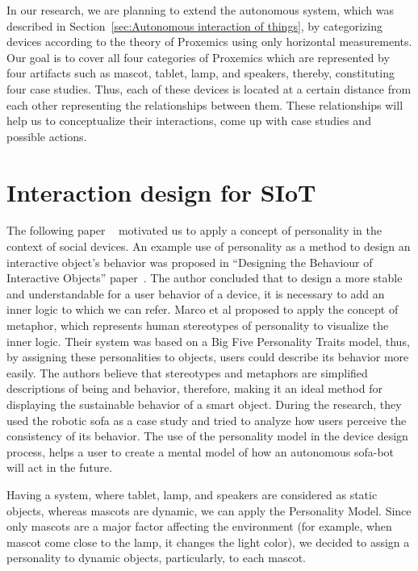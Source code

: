 In our research, we are planning to extend the autonomous system, which was
described in Section~\ref{sec:Autonomous interaction of things}, by categorizing devices
according to the theory of Proxemics using only horizontal measurements.
Our goal is to cover all four categories of Proxemics which are represented by four
artifacts such as mascot, tablet, lamp, and speakers, thereby, constituting four case studies.
Thus, each of these devices is located at a certain distance from each other representing
the relationships between them.
These relationships will help us to conceptualize their interactions, come up with case studies and possible actions.

\section{Interaction design for SIoT}
\label{sec:Interaction design for SIoT}

The following paper ~\cite{soro2018social} motivated us to apply a concept of
personality in the context of social devices.
An example use of personality as a method to design an interactive object’s behavior
was proposed in “Designing the Behaviour of Interactive Objects” paper~\cite{spadafora2016designing}.
The author concluded that to design a more stable and understandable
for a user behavior of a device, it is necessary to add an inner logic to which we can refer.
Marco et al proposed to apply the concept of metaphor, which represents human stereotypes
of personality to visualize the inner logic.
Their system was based on a Big Five Personality Traits model, thus,
by assigning these personalities to objects, users could describe its behavior more easily.
The authors believe that stereotypes and metaphors are simplified descriptions of being and behavior,
therefore, making it an ideal method for displaying the sustainable behavior of a smart object.
During the research, they used the robotic sofa as a case study and tried to analyze how
users perceive the consistency of its behavior.
The use of the personality model in the device design process, helps a user to create
a mental model of how an autonomous sofa-bot will act in the future.

Having a system, where tablet, lamp, and speakers are considered as static objects,
whereas mascots are dynamic, we can apply the Personality Model.
Since only mascots are a major factor affecting the environment
(for example, when mascot come close to the lamp, it changes the light color), we decided to
assign a personality to dynamic objects, particularly, to each mascot.


